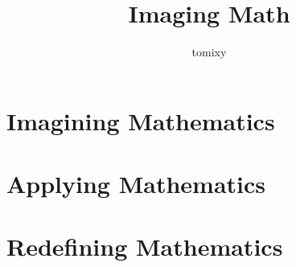 \documentclass[b5paper]{book}
\title{Imaging Math}
\author{tomixy}
\begin{document}
\maketitle
\tableofcontents

\part{Imagining Mathematics}









\part{Applying Mathematics}



\part{Redefining Mathematics}



\end{document}
